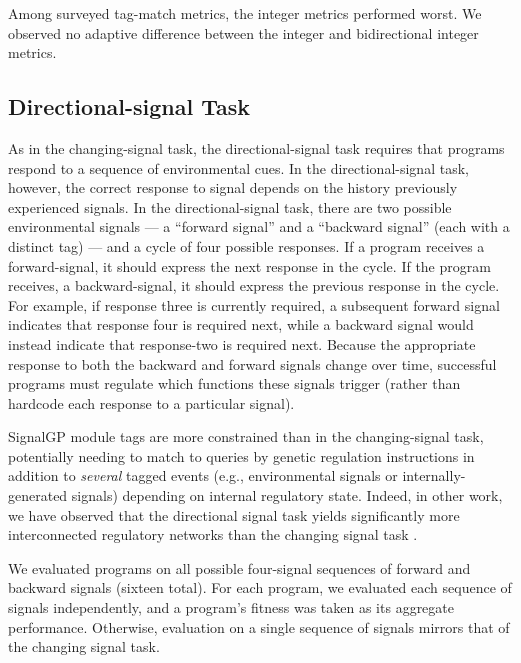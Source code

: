 Among surveyed tag-match metrics, the integer metrics performed worst.
We observed no adaptive difference  between the integer and bidirectional integer metrics.

\subsection{Directional-signal Task} \label{sec:directional-signal}



As in the changing-signal task, the directional-signal task requires that programs respond to a sequence of environmental cues.
In the directional-signal task, however, the correct response to signal depends on the history previously experienced signals.
In the directional-signal task, there are two possible environmental signals --- a ``forward signal'' and a ``backward signal'' (each with a distinct tag) ---  and a cycle of four possible responses.
If a program receives a forward-signal, it should express the next response in the cycle.
If the program receives, a backward-signal, it should express the previous response in the cycle.
For example, if response three is currently required, a subsequent forward signal indicates that response four is required next, while a backward signal would instead indicate that response-two is required next.
Because the appropriate response to both the backward and forward signals change over time, successful programs must regulate which functions these signals trigger (rather than hardcode each response to a particular signal).

SignalGP module tags are more constrained than in the changing-signal task, potentially needing to match to queries by genetic regulation instructions in addition to \textit{several} tagged events (e.g., environmental signals or internally-generated signals) depending on internal regulatory state.
Indeed, in other work, we have observed that the directional signal task yields significantly more interconnected regulatory networks than the changing signal task \citep{lalejini_tag-based_2021}.

We evaluated programs on all possible four-signal sequences of forward and backward signals (sixteen total).
For each program, we evaluated each sequence of signals independently, and a program's fitness was taken as its aggregate performance.
Otherwise, evaluation on a single sequence of signals mirrors that of the changing signal task.


